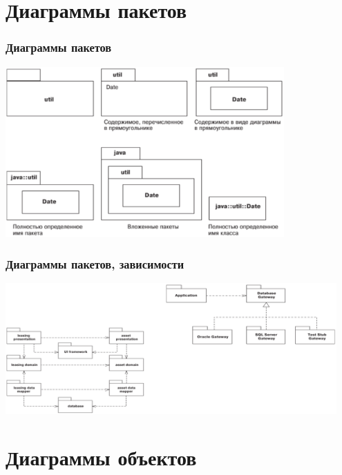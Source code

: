 \documentclass{../mcsslides}
\begin{document}
    \section{Диаграммы пакетов}

    \begin{frame}
        \frametitle{Диаграммы пакетов}
        \begin{center}
            \includegraphics[width=0.8\textwidth]{packageDiagrams.png}
        \end{center}
    \end{frame}

    \begin{frame}
        \frametitle{Диаграммы пакетов, зависимости}
        \begin{center}
            \includegraphics[width=0.95\textwidth]{packageDependencies.png}
        \end{center}
    \end{frame}

    \section{Диаграммы объектов}
\end{document}
